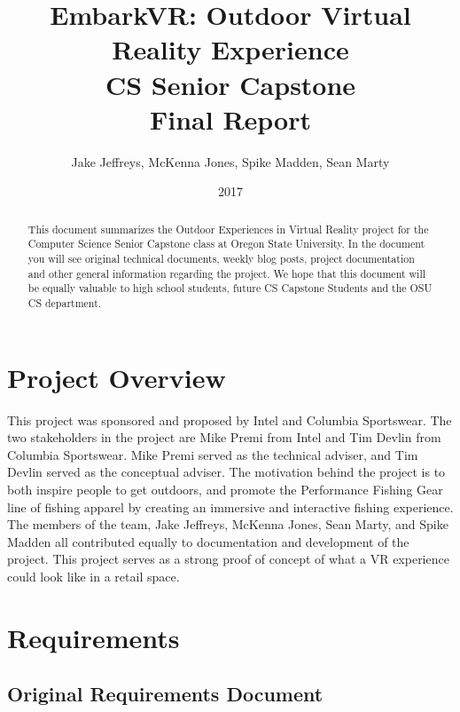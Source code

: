 \documentclass[10pt,journal,compsoc,onecolumn, draftclsnofoot]{IEEEtran}
\title{
EmbarkVR: Outdoor Virtual Reality Experience \\
CS Senior Capstone \\
Final Report\\
\vspace{1mm}
}
\author{Jake Jeffreys, McKenna Jones, Spike Madden, Sean Marty}
\date{2017}
\begin{document}
\begin{titlepage}
\maketitle
\vspace{1mm}
\begin{abstract}
This document summarizes the Outdoor Experiences in Virtual Reality project for the Computer Science Senior Capstone class at Oregon State University. In the document you will see original technical documents, weekly blog posts, project documentation and other general information regarding the project. We hope that this document will be equally valuable to high school students, future CS Capstone Students and the OSU CS department.

\end{abstract}
\vspace{1cm}

\end{titlepage}

\tableofcontents
\clearpage

\section{Project Overview}
This project was sponsored and proposed by Intel and Columbia Sportswear. The two stakeholders in the project are Mike Premi from Intel and Tim Devlin from Columbia Sportswear. Mike Premi served as the technical adviser, and Tim Devlin served as the conceptual adviser. The motivation behind the project is to both inspire people to get outdoors, and promote the Performance Fishing Gear line of fishing apparel by creating an immersive and interactive fishing experience. The members of the team, Jake Jeffreys, McKenna Jones, Sean Marty, and Spike Madden all contributed equally to documentation and development of the project. This project serves as a strong proof of concept of what a VR experience could look like in a retail space.

\section{Requirements}
\subsection{Original Requirements Document}

\end{document}
